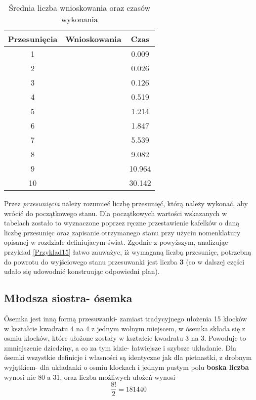     \begin{table}[H]
        \centering
         \begin{tabular}{||c | c | c|} 
         \hline
         Przesunięcia & Wnioskowania & Czas \\ [0.5ex] 
         \hline\hline
         1 &  & 0.009 \\ 
         \hline
         2 &  & 0.026 \\
         \hline
         3 &  & 0.126  \\
         \hline
         4 &  & 0.519  \\
         \hline
         5 &  & 1.214 \\
         \hline
         6 &  & 1.847 \\ 
         \hline
         7 &  & 5.539 \\
         \hline
         8 &  & 9.082 \\
         \hline
         9 &  & 10.964 \\
         \hline
         10 &  & 30.142 \\ [1ex]
         \hline
         \end{tabular}
         \caption{Średnia liczba wnioskowania oraz czasów wykonania}
    \end{table}
    Przez \textit{przesunięcia} należy rozumieć liczbę przesunięć, którą należy wykonać, aby wrócić do początkowego stanu. Dla początkowych wartości 
    wskazanych w tabelach zostało to wyznaczone poprzez ręczne przestawienie kafelków o daną liczbę przesunięc oraz zapisanie otrzymanego stanu 
    przy użyciu nomenklatury opisanej w rozdziale definiujacym świat. Zgodnie z powyższym, analizując przykład \ref{Przyklad15} łatwo zauważyc, 
    iż wymaganą liczbą przesunięc, potrzebną do powrotu do wyjściowego stanu przesuwanki jest liczba \textbf{3} (co w dalszej części udało się 
    udowodnić konstruując odpowiedni plan).



    \subsection{Młodsza siostra- ósemka}
        Ósemka jest inną formą przesuwanki- zamiast tradycyjnego ułożenia 15 klocków w kształcie kwadratu 4 na 4 z jednym wolnym miejscem, w ósemka 
        składa się z osmiu klocków, które ułożone zostały w kształcie kwadratu 3 na 3. Powoduje to zmniejszenie dziedziny, a co za tym idzie- 
        łatwiejsze i szybsze układanie. Dla ósemki wszystkie definicje i własności są identyczne jak dla pietnastki, z drobnym wyjątkiem- dla 
        układanki o osmiu klockach i jednym pustym polu \textbf{boska liczba} wynosi nie 80 a 31\cite{Eight}, oraz liczba możliwych ułożeń wynosi 
        \begin{equation}
            \frac{8!}{2} = 181440
        \end{equation} 
